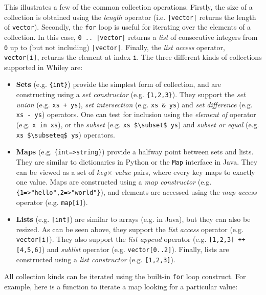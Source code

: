 This illustrates a few of the common collection operations.  Firstly,
the size of a collection is obtained using the {\em length} operator
(i.e. \lstinline{|vector|} returns the length of \lstinline{vector}).
Secondly, the \lstinline{for} loop is useful for iterating over the
elements of a collection.  In this case, \lstinline{0 .. |vector|}
returns a {\em list} of consecutive integers from \lstinline{0} up to
(but not including) \lstinline{|vector|}.  Finally, the {\em list
  access} operator, \lstinline{vector[i]}, returns the element at
index \lstinline{i}.  The three different kinds of collections
supported in Whiley are:
\begin{itemize}
\item {\bf Sets} (e.g. \lstinline|{int}|) provide the simplest form of collection, and are constructing using a {\em set constructor} (e.g. \lstinline|{1,2,3}|).  They support the {\em set union} (e.g. \lstinline{xs + ys}), {\em set intersection} (e.g. \lstinline{xs & ys}) and {\em set difference} (e.g. \lstinline{xs - ys}) operators.  One can test for inclusion using the {\em element of} operator (e.g. \lstinline{x in xs}), or the {\em subset} (e.g. \lstinline{xs $\subset$ ys}) and {\em subset or equal} (e.g. \lstinline{xs $\subseteq$ ys}) operators.
  
\item {\bf Maps} (e.g. \lstinline|{int=>string}|) provide a halfway point between sets and lists.  They are similar to dictionaries in Python or the \lstinline{Map} interface in Java.  They can be viewed as a set of {\em key$\times$ value} pairs, where every key maps to exactly one value.  Maps are constructed using a {\em map constructor} (e.g. \lstinline|{1=>"hello",2=>"world"}|), and elements are accessed using the {\em map access} operator (e.g. \lstinline{map[i]}).  

\item {\bf Lists} (e.g. \lstinline{[int]}) are similar to arrays
  (e.g. in Java), but they can also be resized.  As can be seen above,
  they support the {\em list access} operator
  (e.g. \lstinline{vector[i]}).  They also support the {\em list
    append} operator (e.g. \lstinline{[1,2,3] ++ [4,5,6]}) and {\em
    sublist} operator (e.g. \lstinline{vector[0..2]}).  Finally, lists are constructed using a {\em list constructor} (e.g. \lstinline{[1,2,3]}).

\end{itemize}

All collection kinds can be iterated using the built-in
\lstinline{for} loop construct.  For example, here is a function to iterate a map looking for a particular value:

